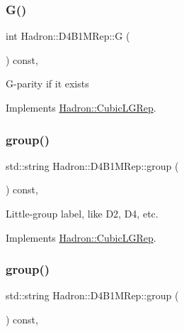 \subsubsection{\texorpdfstring{G()}{G()}\hspace{0.1cm}{\footnotesize\ttfamily [2/2]}}
{\footnotesize\ttfamily int Hadron\+::\+D4\+B1\+M\+Rep\+::G (\begin{DoxyParamCaption}{ }\end{DoxyParamCaption}) const\hspace{0.3cm}{\ttfamily [inline]}, {\ttfamily [virtual]}}

G-\/parity if it exists 

Implements \mbox{\hyperlink{structHadron_1_1CubicLGRep_ace26f7b2d55e3a668a14cb9026da5231}{Hadron\+::\+Cubic\+L\+G\+Rep}}.

\mbox{\label{structHadron_1_1D4B1MRep_ad15b8741fcc6e6c63b0125b283dbbbab}} 
\subsubsection{\texorpdfstring{group()}{group()}\hspace{0.1cm}{\footnotesize\ttfamily [1/2]}}
{\footnotesize\ttfamily std\+::string Hadron\+::\+D4\+B1\+M\+Rep\+::group (\begin{DoxyParamCaption}{ }\end{DoxyParamCaption}) const\hspace{0.3cm}{\ttfamily [inline]}, {\ttfamily [virtual]}}

Little-\/group label, like D2, D4, etc. 

Implements \mbox{\hyperlink{structHadron_1_1CubicLGRep_a9bdb14b519a611d21379ed96a3a9eb41}{Hadron\+::\+Cubic\+L\+G\+Rep}}.

\mbox{\label{structHadron_1_1D4B1MRep_ad15b8741fcc6e6c63b0125b283dbbbab}} 
\subsubsection{\texorpdfstring{group()}{group()}\hspace{0.1cm}{\footnotesize\ttfamily [2/2]}}
{\footnotesize\ttfamily std\+::string Hadron\+::\+D4\+B1\+M\+Rep\+::group (\begin{DoxyParamCaption}{ }\end{DoxyParamCaption}) const\hspace{0.3cm}{\ttfamily [inline]}, {\ttfamily [virtual]}}


